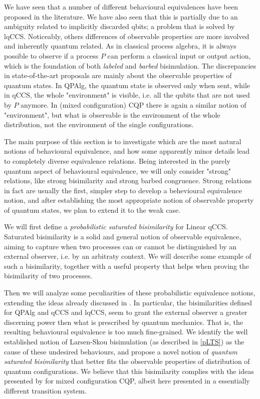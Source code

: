 We have seen that a number of different behavioural equivalences have been proposed in the literature. We have also seen that this is partially due to an ambiguity related to implicitly discarded qbits; a problem that is solved by  lqCCS. Noticeably, others  differences of observable properties are more involved and inherently quantum related. As in classical process algebra, it is always possible to observe if a process $P$ can perform a classical input or output action, which is the foundation of both \textit{labeled} and \textit{barbed} bisimulation. The discrepancies in state-of-the-art proposals are mainly about the observable properties of quantum states. In QPAlg, the quantum state is observed only when sent, while in qCCS, the whole "environment" is visible, i.e. all the qubits that are not used by $P$ anymore. In (mixed configuration) CQP there is again a similar notion of "environment", but what is observable is the environment of the whole distribution, not the environment of the single configurations.

The main purpose of this section is to investigate which are the most natural notions of behavioural equivalence, and how some apparently minor details lead to completely diverse equivalence relations. Being interested in the purely quantum aspect of behavioural equivalence, we will only consider "strong" relations, like strong bisimilarity and strong barbed congruence. Strong relations in fact are usually the first, simpler step to develop a behevioural equivalence notion, and after establishing the most appropriate notion of observable property of quantum states, we plan to extend it to the weak case.

We will first define a \textit{probabilistic saturated bisimilarity} \cite{bonchiGeneralTheoryBarbs2014} for Linear qCCS. Saturated bisimilarity is a solid and general notion of observable equivalence, aiming to capture when two processes can or cannot be distinguished by an external observer, i.e. by an arbitraty context. We will describe some example of such a bisimilarity, together with a useful property that helps when proving the bisimilarity of two processes.

Then we will analyze some peculiarities of these probabilistic equivalence notions, extending the ideas already discussed in \cite{davidsonFormalVerificationTechniques2012}. In particular, the bisimilarities defined for QPAlg and qCCS and lqCCS, seem to grant the external observer a greater discerning power then what is prescribed by quantum mechanics. That is, the resulting behavioural equivalence is too much  fine-grained. We identify the well established notion of Larsen-Skou bisimulation (as described in \ref{pLTS}) as the cause of these undesired behaviours, and propose a novel notion of \textit{quantum saturated bisimilarity} that better fits the observable properties of distribution of quantum configurations. We believe that this bisimilarity complies with the ideas presented by \cite{davidsonFormalVerificationTechniques2012} for mixed configuration CQP, albeit here presented in a essentially different transition system.

